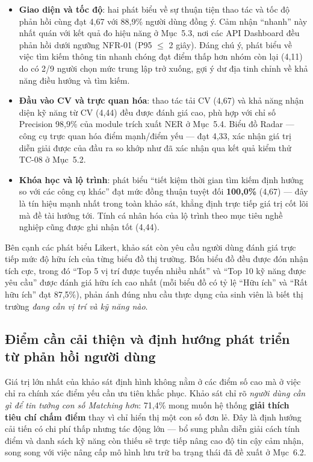 \begin{itemize}
    \item \textbf{Giao diện và tốc độ}: hai phát biểu về sự thuận tiện thao tác và tốc độ phản hồi cùng đạt 4,67 với 88,9\% người dùng đồng ý. Cảm nhận ``nhanh'' này nhất quán với kết quả đo hiệu năng ở Mục~5.3, nơi các API Dashboard đều phản hồi dưới ngưỡng NFR-01 (P95 $\le$ 2 giây). Đáng chú ý, phát biểu về việc tìm kiếm thông tin nhanh chóng đạt điểm thấp hơn nhóm còn lại (4,11) do có 2/9 người chọn mức trung lập trở xuống, gợi ý dư địa tinh chỉnh về khả năng điều hướng và tìm kiếm.
    \item \textbf{Đầu vào CV và trực quan hóa}: thao tác tải CV (4,67) và khả năng nhận diện kỹ năng từ CV (4,44) đều được đánh giá cao, phù hợp với chỉ số Precision 98,9\% của module trích xuất NER ở Mục~5.4. Biểu đồ Radar --- công cụ trực quan hóa điểm mạnh/điểm yếu --- đạt 4,33, xác nhận giá trị diễn giải được của đầu ra so khớp như đã xác nhận qua kết quả kiểm thử TC-08 ở Mục~5.2.
    \item \textbf{Khóa học và lộ trình}: phát biểu ``tiết kiệm thời gian tìm kiếm định hướng so với các công cụ khác'' đạt mức đồng thuận tuyệt đối \textbf{100,0\%} (4,67) --- đây là tín hiệu mạnh nhất trong toàn khảo sát, khẳng định trực tiếp giá trị cốt lõi mà đề tài hướng tới. Tính cá nhân hóa của lộ trình theo mục tiêu nghề nghiệp cũng được ghi nhận tốt (4,44).
\end{itemize}


Bên cạnh các phát biểu Likert, khảo sát còn yêu cầu người dùng đánh giá trực tiếp mức độ hữu ích của từng biểu đồ thị trường. Bốn biểu đồ đều được đón nhận tích cực, trong đó ``Top 5 vị trí được tuyển nhiều nhất'' và ``Top 10 kỹ năng được yêu cầu'' được đánh giá hữu ích cao nhất (mỗi biểu đồ có tỷ lệ ``Hữu ích'' và ``Rất hữu ích'' đạt 87,5\%), phản ánh đúng nhu cầu thực dụng của sinh viên là biết thị trường \textit{đang cần vị trí và kỹ năng nào}.

\subsection{Điểm cần cải thiện và định hướng phát triển từ phản hồi người dùng}

Giá trị lớn nhất của khảo sát định hình không nằm ở các điểm số cao mà ở việc chỉ ra chính xác điểm yếu cần ưu tiên khắc phục. Khảo sát chỉ rõ \textit{người dùng cần gì để tin tưởng con số Matching hơn}: 71,4\% mong muốn hệ thống \textbf{giải thích tiêu chí chấm điểm} thay vì chỉ hiển thị một con số đơn lẻ. Đây là định hướng cải tiến có chi phí thấp nhưng tác động lớn --- bổ sung phần diễn giải cách tính điểm và danh sách kỹ năng còn thiếu sẽ trực tiếp nâng cao độ tin cậy cảm nhận, song song với việc nâng cấp mô hình lưu trữ ba trạng thái đã đề xuất ở Mục~6.2.

